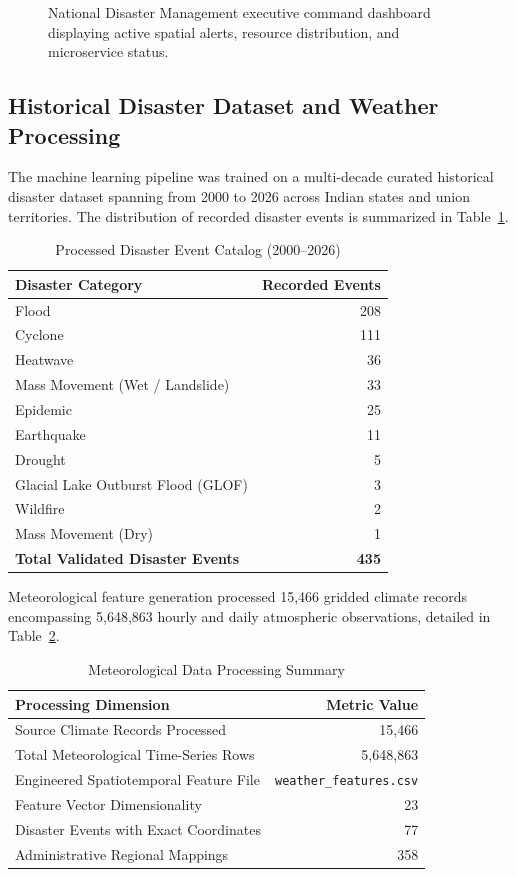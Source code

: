 \documentclass[conference]{IEEEtran}
\begin{document}
\begin{figure}[h]
\centering
\fbox{\rule{0pt}{1.8in} \rule{0.9\linewidth}{0pt}}
\caption{National Disaster Management executive command dashboard displaying active spatial alerts, resource distribution, and microservice status.}
\label{fig:dashboard}
\end{figure}

\subsection{Historical Disaster Dataset and Weather Processing}
The machine learning pipeline was trained on a multi-decade curated historical disaster dataset spanning from 2000 to 2026 across Indian states and union territories. The distribution of recorded disaster events is summarized in Table~\ref{tab:disaster_data}.

\begin{table}[h]
\centering
\caption{Processed Disaster Event Catalog (2000--2026)}
\label{tab:disaster_data}
\begin{tabular}{lr}
\toprule
\textbf{Disaster Category} & \textbf{Recorded Events} \\
\midrule
Flood & 208 \\
Cyclone & 111 \\
Heatwave & 36 \\
Mass Movement (Wet / Landslide) & 33 \\
Epidemic & 25 \\
Earthquake & 11 \\
Drought & 5 \\
Glacial Lake Outburst Flood (GLOF) & 3 \\
Wildfire & 2 \\
Mass Movement (Dry) & 1 \\
\midrule
\textbf{Total Validated Disaster Events} & \textbf{435} \\
\bottomrule
\end{tabular}
\end{table}

Meteorological feature generation processed 15,466 gridded climate records encompassing 5,648,863 hourly and daily atmospheric observations, detailed in Table~\ref{tab:weather_summary}.

\begin{table}[h]
\centering
\caption{Meteorological Data Processing Summary}
\label{tab:weather_summary}
\begin{tabular}{lr}
\toprule
\textbf{Processing Dimension} & \textbf{Metric Value} \\
\midrule
Source Climate Records Processed & 15,466 \\
Total Meteorological Time-Series Rows & 5,648,863 \\
Engineered Spatiotemporal Feature File & \texttt{weather\_features.csv} \\
Feature Vector Dimensionality & 23 \\
Disaster Events with Exact Coordinates & 77 \\
Administrative Regional Mappings & 358 \\
\bottomrule
\end{tabular}
\end{table}
\end{document}
